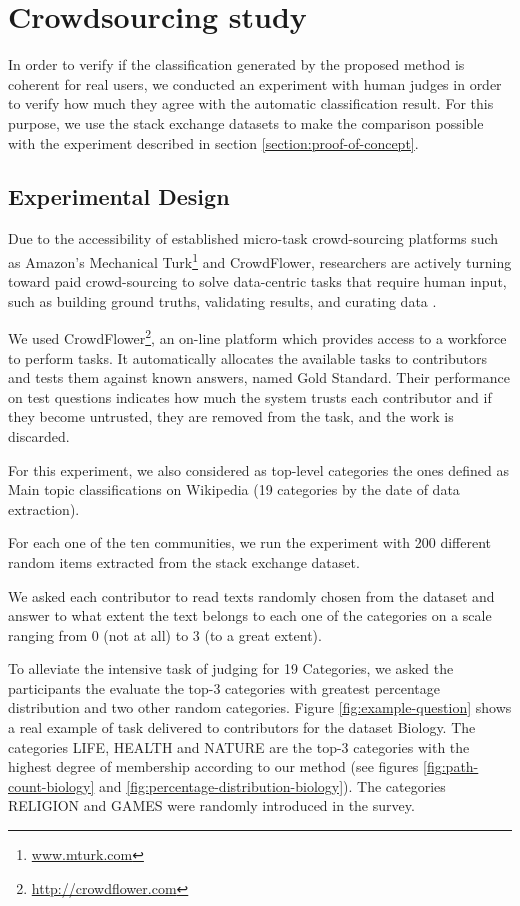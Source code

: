 \section{\hspace*{3pt} Crowdsourcing study}

In order to verify if the classification generated by the proposed method is coherent for real users, we conducted an experiment with human judges in order to verify how much they agree with the automatic classification result. For this purpose, we use the stack exchange datasets to make the comparison possible with the experiment described in section \ref{section:proof-of-concept}.



\subsection{\hspace*{3pt} Experimental Design}

Due to the accessibility of established micro-task crowd-sourcing platforms such as Amazon’s Mechanical Turk\footnote{\url{www.mturk.com}} and CrowdFlower, researchers are actively turning toward paid crowd-sourcing to solve data-centric tasks that require human input, such as building ground truths, validating results, and curating data \cite{7156008}.

We used CrowdFlower\footnote{\url{http://crowdflower.com}}, an on-line platform which provides access to a workforce to perform tasks.  It automatically allocates the available tasks to contributors and tests them against known answers, named Gold Standard. Their performance on test questions indicates how much the system trusts each contributor and if they become untrusted, they are removed from the task, and the work is discarded.

For this experiment, we also considered as top-level categories the ones defined as Main topic classifications on Wikipedia (19 categories by the date of data extraction). 

For each one of the ten communities, we run the experiment with 200 different random items extracted from the stack exchange dataset. 

We asked each contributor to read texts randomly chosen from the dataset and answer to what extent the text belongs to each one of the categories on a scale ranging from 0 (not at all) to 3 (to a great extent). 

To alleviate the intensive task of judging for 19 Categories, we asked the participants the evaluate the top-3 categories with greatest percentage distribution and two other random categories.  Figure \ref{fig:example-question} shows a real example of task delivered to contributors for the dataset Biology. The categories LIFE, HEALTH and NATURE are the top-3 categories with the highest degree of membership according to our method (see figures \ref{fig:path-count-biology} and \ref{fig:percentage-distribution-biology}). The categories RELIGION and GAMES were randomly introduced in the survey. 

